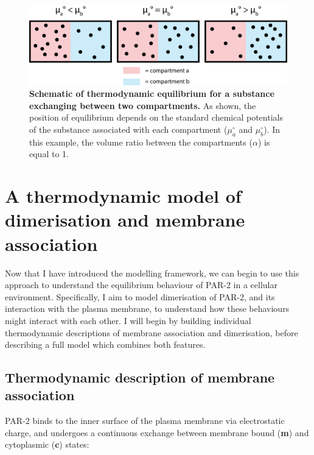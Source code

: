 \documentclass[12pt]{"report"}
\newcommand{\mycaption}[2]{\caption[#1]{\textbf{#1.} #2}}
\begin{document}
\begin{figure}
\includegraphics[scale=0.9]{thermodynamic_simple_example}
\centering
\mycaption{Schematic of thermodynamic equilibrium for a substance exchanging between two compartments}{
As shown, the position of equilibrium depends on the standard chemical potentials of the substance associated with each compartment ($\mu_a^{\circ}$ and $\mu_b^{\circ}$). In this example, the volume ratio between the compartments ($\alpha$) is equal to 1.}
\label{fig:thermodynamic_simple_example}
\end{figure}



\clearpage
\section{A thermodynamic model of dimerisation and membrane association}
\label{section:thermodynamic_full_model}

Now that I have introduced the modelling framework, we can begin to use this approach to understand the equilibrium behaviour of PAR-2 in a cellular environment. Specifically, I aim to model dimerisation of PAR-2, and its interaction with the plasma membrane, to understand how these behaviours might interact with each other. I will begin by building individual thermodynamic descriptions of membrane association and dimerisation, before describing a full model which combines both features.\\

\subsection{Thermodynamic description of membrane association}
\label{section:thermodynamic_membrane_binding}

PAR-2 binds to the inner surface of the plasma membrane via electrostatic charge, and undergoes a continuous exchange between membrane bound (\textbf{m}) and cytoplasmic (\textbf{c}) states:

\begin{center}
\end{center}
\end{document}
